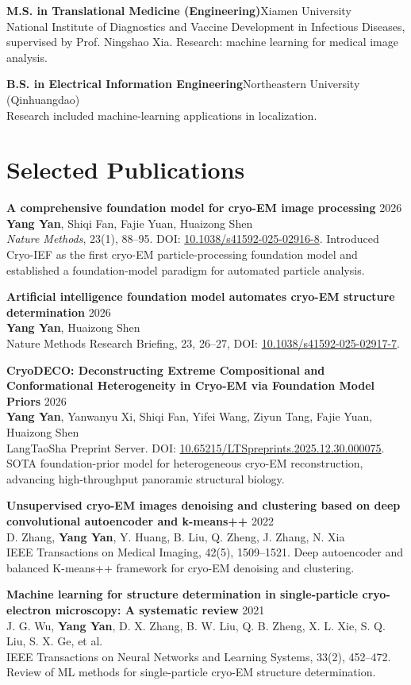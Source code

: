 \documentclass[10pt,letterpaper]{article}
\newcommand{\entry}[4]{%
  \Needspace{3.2\baselineskip}%
  \noindent
  \begin{minipage}[t]{0.14\linewidth}
    \vspace{0pt}{\small\color{Muted}#1}
  \end{minipage}\hfill
  \begin{minipage}[t]{0.83\linewidth}
    \vspace{0pt}
    \textbf{#2}\hfill{\small\color{Muted}#3}\\[-1pt]
    #4
  \end{minipage}\par\vspace{4pt}
}
\newcommand{\pub}[4]{%
  \textbf{#1} \hfill {\small\color{Muted}#4}\\[-1pt]
  #2\\[-1pt]
  {\small\color{Muted}#3}\vspace{2.5pt}
}
\begin{document}
\entry{2020--2023}{M.S. in Translational Medicine (Engineering)}{Xiamen University}{National Institute of Diagnostics and Vaccine Development in Infectious Diseases, supervised by Prof. Ningshao Xia. Research: machine learning for medical image analysis.}

\entry{2016--2020}{B.S. in Electrical Information Engineering}{Northeastern University (Qinhuangdao)}{Research included machine-learning applications in localization.}


\section*{Selected Publications}
\pub{A comprehensive foundation model for cryo-EM image processing}
{\textbf{Yang Yan}, Shiqi Fan, Fajie Yuan, Huaizong Shen}
{\textit{Nature Methods}, 23(1), 88--95. DOI: \href{https://doi.org/10.1038/s41592-025-02916-8}{10.1038/s41592-025-02916-8}. Introduced Cryo-IEF as the first cryo-EM particle-processing foundation model and established a foundation-model paradigm for automated particle analysis.}
{2026}

\pub{Artificial intelligence foundation model automates cryo-EM structure determination}
{\textbf{Yang Yan}, Huaizong Shen}
{Nature Methods Research Briefing, 23, 26--27, DOI: \href{https://doi.org/10.1038/s41592-025-02917-7}{10.1038/s41592-025-02917-7}.}
{2026}

\pub{CryoDECO: Deconstructing Extreme Compositional and Conformational Heterogeneity in Cryo-EM via Foundation Model Priors}
{\textbf{Yang Yan}, Yanwanyu Xi, Shiqi Fan, Yifei Wang, Ziyun Tang, Fajie Yuan, Huaizong Shen}
{LangTaoSha Preprint Server. DOI: \href{https://doi.org/10.65215/LTSpreprints.2025.12.30.000075}{10.65215/LTSpreprints.2025.12.30.000075}. SOTA foundation-prior model for heterogeneous cryo-EM reconstruction, advancing high-throughput panoramic structural biology.}
{2026}

\pub{Unsupervised cryo-EM images denoising and clustering based on deep convolutional autoencoder and k-means++}
{D. Zhang, \textbf{Yang Yan}, Y. Huang, B. Liu, Q. Zheng, J. Zhang, N. Xia}
{IEEE Transactions on Medical Imaging, 42(5), 1509--1521. Deep autoencoder and balanced K-means++ framework for cryo-EM denoising and clustering.}
{2022}


\pub{Machine learning for structure determination in single-particle cryo-electron microscopy: A systematic review}
{J. G. Wu, \textbf{Yang Yan}, D. X. Zhang, B. W. Liu, Q. B. Zheng, X. L. Xie, S. Q. Liu, S. X. Ge, et al.}
{IEEE Transactions on Neural Networks and Learning Systems, 33(2), 452--472. Review of ML methods for single-particle cryo-EM structure determination.}
{2021}
\end{document}
